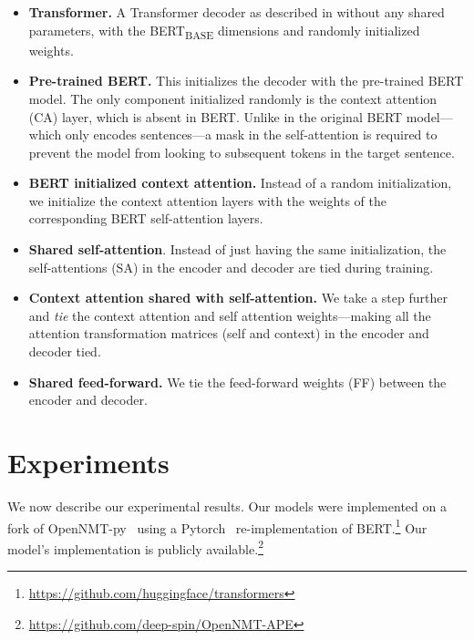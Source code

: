 \begin{itemize}
  \item \textbf{Transformer.} A Transformer decoder as described in
        \citet{vaswani2017attention} without any shared parameters,
        with the BERT\textsubscript{BASE} dimensions and randomly
        initialized weights.
  \item \textbf{Pre-trained BERT.} This initializes the decoder with
        the pre-trained BERT model. The only component initialized randomly
        is the context attention (CA) layer, which is absent in BERT. Unlike
        in the original BERT model---which only encodes sentences---a mask in
        the self-attention is required to prevent the model from looking to
        subsequent tokens in the target sentence.
  \item \textbf{ BERT initialized context attention.} Instead of a
        random initialization, we initialize the context attention layers
        with the weights of the corresponding BERT self-attention layers.
  \item \textbf{Shared self-attention}. Instead of just having the same
        initialization, the self-attentions (SA) in the encoder and decoder
        are tied during training.
  \item \textbf{Context attention shared with self-attention.} We take
        a step further and \emph{tie} the context attention and self
        attention weights---making all the attention transformation matrices
        (self and context) in the encoder and decoder tied.
  \item \textbf{Shared feed-forward.} We tie the feed-forward weights
        (FF) between the encoder and decoder.
\end{itemize}

\section{Experiments} \label{sec:experiments}

We now describe our experimental results. Our models were implemented
on a fork of OpenNMT-py~\citep{klein2017opennmt} using a
Pytorch~\citep{pytorch} re-implementation of
BERT.\footnote{\url{https://github.com/huggingface/transformers}}
Our model's implementation is publicly
available.\footnote{\url{https://github.com/deep-spin/OpenNMT-APE}}


